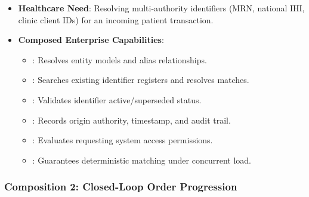 \begin{itemize}

\item 
\textbf{Healthcare Need}: Resolving multi-authority identifiers (MRN, national IHI, clinic client IDs) for an incoming patient transaction.



\item 
\textbf{Composed Enterprise Capabilities}:


\begin{itemize}

\item 
\texttt{}: Resolves entity models and alias relationships.



\item 
\texttt{}: Searches existing identifier registers and resolves matches.



\item 
\texttt{}: Validates identifier active/\allowbreak{}superseded status.



\item 
\texttt{}: Records origin authority, timestamp, and audit trail.



\item 
\texttt{}: Evaluates requesting system access permissions.



\item 
\texttt{}: Guarantees deterministic matching under concurrent load.



\end{itemize}


\end{itemize}
\label{rad:enterprise:291}
\subsubsection*{Composition 2: Closed-Loop Order Progression}
\label{rad:enterprise:292}

